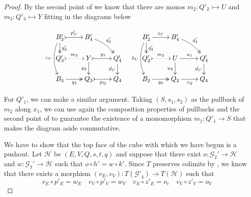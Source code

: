 \documentclass[3p]{elsarticle}
\def\B{\textbf {\textup{B}}}
\newcommand{\commentato}[1]{ {} }
\newcommand{\mto}{\rightarrowtail}
\theoremstyle{remark}
\theoremstyle{definition}
\begin{document}
\begin{proof}
	By the second point of  we know that there are monos $m_2\colon Q'_2\mto U$ and $m_3\colon Q'_3\mto Y$  fitting in the diagrams below
	
	\[\xymatrix@R=15pt{B'_3 \ar@{>>}[d]^{q'_3} \ar@/_.3cm/[dd]_{c_V} \ar@{>->}[r]^{p'_V}& B'_4 \ar@/^.2cm/@{>>}[dr]^{q'_4} & & B'_2 \ar[r]^{z_V} \ar@{>>}[d]^{q'_2} \ar@/_.3cm/[dd]_{b_V}& B'_4 \ar@/^.2cm/@{>>}[dr]^{q'_4}\\ Q'_3 \ar@{>.>}[r]^{m_3}& Y  \ar@{>->}[r]^{y_1} \ar[d]_{y_2}& Q'_4 \ar[d]_{d_C}& Q'_2 \ar@{>.>}[r]^{m_2} & U \ar[d]_{u_2} \ar[r]^{u_1} & Q'_4 \ar[d]_{d_C} \\ B_3 \ar@{>>}[r]_{q_3} & Q_3 \ar@{>->}[r]_{p_Q} & Q_4 &B_2 \ar@{>>}[r]_{q_3} & Q_2 \ar[r]_{z_Q} & Q_4}\]

\newpage
	\noindent 
	\parbox{8.5cm}{\hspace{15pt}
	For $Q'_1$, we can make a similar argument. Taking $(S, s_1, s_2)$ as the pullback of $m_2$ along $x_1$, we can use again the composition properties of pullbacks and the second point of  to guarantee the existence of a monomorphism $m_1\colon Q'_1\to S$ that makes the diagram aside commutative.}\hfill
	\parbox{4cm}{}

We have to show that the top face of the cube with which we have begun is a pushout. Let $\mathcal{H}$ be $(E, V, Q, s, t, q)$ and suppose that there exist  $o\colon  \mathcal{G}_2' \to \mathcal{H}$ and $w\colon  \mathcal{G}_3' \to \mathcal{H}$ such that $o \circ h' = w \circ k'$. Since $T$ preserves colimits by , we know that there exists a morphism $(v_E, v_V)\colon T(\mathcal{G'}_4)\to T(\mathcal{H})$ such that
\[v_E\circ p'_E=w_E \quad v_V\circ p'_V=w_V \quad v_E\circ z'_E=o_e \quad v_V\circ z'_V=o_V\]

\commentato{\xymatrix@C=10pt@R=6pt{
		&B_1'\ar@{>>}[dd]|\hole_(.65){q_1'}\ar@{>->}[rr]^{h_V'} \ar[dl]_(.6){k_V'} && B_2' \ar@{>>}[dd]|\hole_(.65){q_2'} \ar[dl]_(.6){z_V'}\ar[dr]^{o_V}\\
		B_3'  \ar@{>>}[dd]_{q_3'}\ar@{>->}[rr]^(.7){p_V'} & & B_4' \ar@{>>}[dd]_(.3){q_4'} \ar[rr]^(.7){v_V}&&  V\ar[dd]^{q}\\
		&Q_1'\ar@{>->}[rr]|\hole^(.65){h'_Q} \ar[dl]_{k'_Q} && Q_2' \ar[dl]^(.4){z_Q'}\ar[dr]^{o_Q}\\
		Q'_3 \ar@{>->}[rr]_{p_Q'} & & Q'_4\ar@{.>}[rr]_{v_C} && Q
}}


\end{proof}
\end{document}
